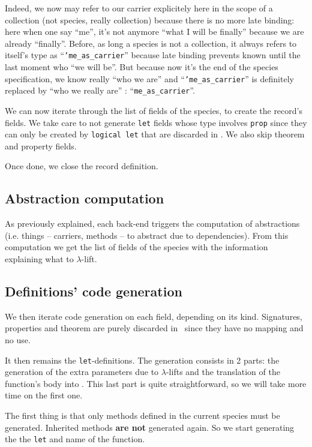 Indeed, we now may refer to our carrier explicitely here in the scope
of a collection (not species, really collection)  because there is no
more late binding: here when one say ``me'', it's not anymore ``what I
will be finally'' because we are already ``finally''. Before, as long
a species is not a collection, it always refers to itself's type as
``{\tt 'me\_as\_carrier}'' because late binding prevents known until
the last moment who ``we will be''. But because now it's the end of
the species specification, we know really ``who we are'' and
``{\tt 'me\_as\_carrier}'' is definitely replaced by ``who we really
are'' : ``{\tt me\_as\_carrier}''.

We can now iterate through the list of fields of the species, to
create the record's fields. We take care to not generate {\tt let}
fields whose type involves {\tt prop} since they can only be created
by {\tt logical let} that are discarded in \ocaml. We also skip
theorem and property fields.

\medskip
Once done, we close the record definition.


\subsection{Abstraction computation}
As previously explained, each back-end triggers the computation of
abstractions (i.e. things -- carriers, methods -- to abstract due to
dependencies). From this computation we get the list of fields of the
species with the information explaining what to $\lambda$-lift.


\subsection{Definitions' code generation}
We then iterate code generation on each field, depending on its kind.
Signatures, properties and theorem are purely discarded in \ocaml\
since they have no mapping and no use.

It then remains the {\tt let}-definitions. The generation consists in
2 parts: the generation of the extra parameters due to $\lambda$-lifts
and the translation of the function's body into \ocaml. This last part
is quite straightforward, so we will take more time on the first one.

The first thing is that only methods defined in the current species
must be generated. Inherited methods {\bf are not} generated again.
So we start generating the the {\tt let} and name of the
function.

